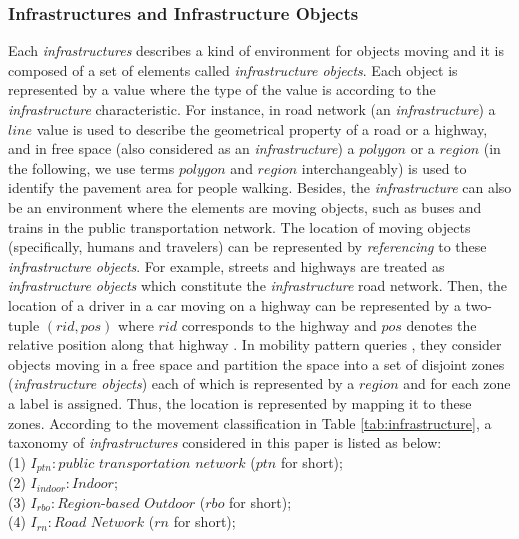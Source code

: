 \subsubsection{Infrastructures and Infrastructure Objects}
\label{sec:infrastructure}
Each \textit{infrastructures} describes a kind of environment for objects moving and it is composed of
a set of elements called \textit{infrastructure objects}. 
Each object is represented by a value where the type of the value
is according to the \textit{infrastructure} characteristic. 
For instance, in road network (an \textit{infrastructure}) a $line$ value is used to describe the 
geometrical property of a road or a highway, and in free space (also considered as an \textit{infrastructure}) a $polygon$ or a $region$ 
(in the following, we use terms $polygon$ and $region$ 
interchangeably) is used to identify the pavement area for people walking. 
Besides, the \textit{infrastructure} can also be an environment where the elements are moving objects, 
such as buses and trains in the public transportation network. The location of moving 
objects (specifically, humans and travelers) can be represented by \textit{referencing} to these \textit{infrastructure objects}. 
For example, streets and highways are treated as \textit{infrastructure objects} which constitute
the \textit{infrastructure} road network. Then, the location of a driver in a car moving on a highway can be represented by a two-tuple $(rid,pos)$ where $rid$ corresponds to the highway and $pos$ denotes the relative position along that highway \cite{GA2006}. In mobility pattern queries \cite{MR05}, 
they consider objects moving in a free space and partition the space into a set of disjoint zones (\textit{infrastructure objects}) each of which is represented by a $region$ and for each zone 
a label is assigned. Thus, the location is represented by mapping it to these zones. 
According to the movement classification in Table \ref{tab:infrastructure}, a taxonomy of 
\textit{infrastructures} considered in this paper is listed as below: \\


(1) $I_{ptn}:public$ $transportation$ $network$ ($ptn$ for short); \\

(2) $I_{indoor}:Indoor$; \\

(3) $I_{rbo}:Region$-$based$ $Outdoor$ ($rbo$ for short); \\

(4) $I_{rn}:Road$ $Network$ ($rn$ for short); \\

